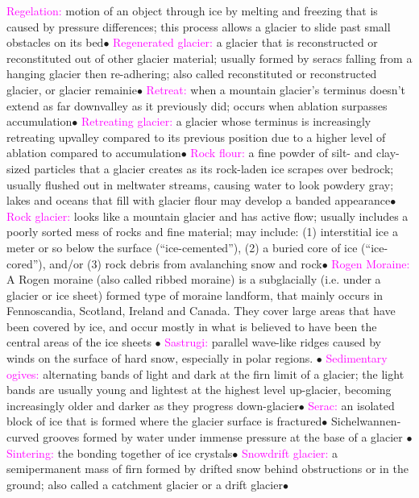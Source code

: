 \documentclass{article}
\newcommand{\ddd}{$\bullet$}
\newcommand{\pink}[1]{\textcolor{magenta}{#1}}
\newcommand{\vocab}[1]{{\pink{#1}}}
\begin{document}
\begin{multicols*}{4}
		\vocab{        Regelation: } motion of an object through ice by melting and freezing that is caused by pressure differences; this process allows a glacier to slide past small obstacles on its bed\ddd
		\vocab{        Regenerated glacier: } a glacier that is reconstructed or reconstituted out of other glacier material; usually formed by seracs falling from a hanging glacier then re-adhering; also called reconstituted or reconstructed glacier, or glacier remainie\ddd
		\vocab{        Retreat: } when a mountain glacier's terminus doesn't extend as far downvalley as it previously did; occurs when ablation surpasses accumulation\ddd
		\vocab{        Retreating glacier: } a glacier whose terminus is increasingly retreating upvalley compared to its previous position due to a higher level of ablation compared to accumulation\ddd
		\vocab{        Rock flour: } a fine powder of silt- and clay-sized particles that a glacier creates as its rock-laden ice scrapes over bedrock; usually flushed out in meltwater streams, causing water to look powdery gray; lakes and oceans that fill with glacier flour may develop a banded appearance\ddd
		\vocab{        Rock glacier: } looks like a mountain glacier and has active flow; usually includes a poorly sorted mess of rocks and fine material; may include: (1) interstitial ice a meter or so below the surface (“ice-cemented”), (2) a buried core of ice (“ice-cored”), and/or (3) rock debris from avalanching snow and rock\ddd
		\vocab{        Rogen Moraine: } A Rogen moraine (also called ribbed moraine) is a subglacially (i.e. under a glacier or ice sheet) formed type of moraine landform, that mainly occurs in Fennoscandia, Scotland, Ireland and Canada. They cover large areas that have been covered by ice, and occur mostly in what is believed to have been the central areas of the ice sheets \ddd
		\vocab{        Sastrugi: } parallel wave-like ridges caused by winds on the surface of hard snow, especially in polar regions. \ddd
		\vocab{        Sedimentary ogives: } alternating bands of light and dark at the firn limit of a glacier; the light bands are usually young and lightest at the highest level up-glacier, becoming increasingly older and darker as they progress down-glacier\ddd
		\vocab{        Serac: } an isolated block of ice that is formed where the glacier surface is fractured\ddd
		\vocab{ }        Sichelwannen- curved grooves formed by water under immense pressure at the base of a glacier \ddd
		\vocab{        Sintering: } the bonding together of ice crystals\ddd
		\vocab{        Snowdrift glacier: } a semipermanent mass of firn formed by drifted snow behind obstructions or in the ground; also called a catchment glacier or a drift glacier\ddd

\end{multicols*}
\end{document}
